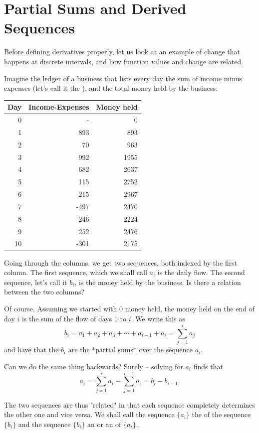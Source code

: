 \section{Partial Sums and Derived Sequences}

Before defining derivatives properly, let us look at an example of change
that happens at discrete intervals, and how function values and change are
related.


Imagine
the ledger of a business that lists every day the sum of income minus expenses
(let's call it the ), and the total money held by the business:

\begin{center}
\begin{tabular}{rrr}
Day&Income-Expenses&Money held\\
\hline
0& - &0\\
1&893&893\\
2&70&963\\
3&992&1955\\
4&682&2637\\
5&115&2752\\
6&215&2967\\
7&-497&2470\\
8&-246&2224\\
9&252&2476\\
10&-301&2175\\
\end{tabular}
\end{center}

Going through the columns, we get two sequences, both indexed by the first
column.  The first sequence, which we shall call $a_i$ is the daily flow.
The second sequence, let's call it $b_i$, is the money held by the business.
Is there a relation between the two columns?

Of course. Assuming we started with $0$ money held, the money held on the end of day
$i$ is the sum of the flow of days $1$ to $i$. We write this as
$$b_i=a_1+a_2+a_3+\cdots+ a_{i-1}+a_i=\sum_{j=1}^i a_j$$
and have that the $b_i$ are the *partial sums* over the sequence $a_i$.

Can we do the same thing backwards? Surely -- solving for $a_i$ finds that
$$a_i=\sum_{j=1}^ia_i-\sum_{j=1}^{i-1}a_i=b_i-b_{i-1}.$$

The two sequences are thus "related" in that each sequence completely
determines the other one and vice versa. We shall call the sequence $\{a_i\}$
the  of the sequence $\{b_i\}$ and the sequence
$\{b_i\}$ 
an  or an
 of $\{a_i\}$.

